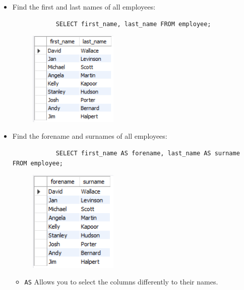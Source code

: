 \begin{itemize}
    \item Find the first and last names of all employees:
        \begin{verbatim}
            SELECT first_name, last_name FROM employee;
        \end{verbatim}
        \begin{figure}[H]
            \centering
            \includegraphics[width=0.4\textwidth]{./Figs/2020-12-24-20-45-46.png}
        \end{figure}
    
    \item  Find the forename and surnames of all employees:
        \begin{verbatim}
            SELECT first_name AS forename, last_name AS surname FROM employee;
        \end{verbatim}
        \begin{figure}[H]
            \centering
            \includegraphics[width=0.4\textwidth]{./Figs/2020-12-24-20-46-18.png}
        \end{figure}
        \begin{itemize}
            \item \texttt{AS} Allows you to select the columns differently to their names.
        \end{itemize}
    

\end{itemize}
